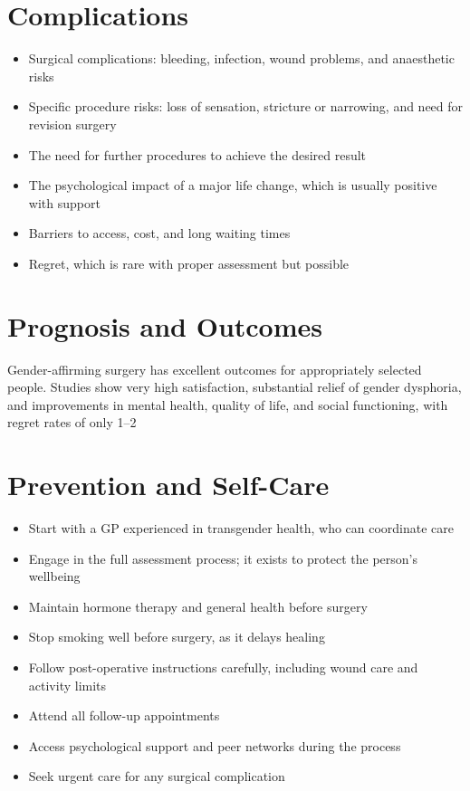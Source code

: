 \section*{Complications}
\begin{itemize}
    \item Surgical complications: bleeding, infection, wound problems, and anaesthetic risks
    \item Specific procedure risks: loss of sensation, stricture or narrowing, and need for revision surgery
    \item The need for further procedures to achieve the desired result
    \item The psychological impact of a major life change, which is usually positive with support
    \item Barriers to access, cost, and long waiting times
    \item Regret, which is rare with proper assessment but possible
\end{itemize}

\section*{Prognosis and Outcomes}
Gender-affirming surgery has excellent outcomes for appropriately selected people. Studies show very high satisfaction, substantial relief of gender dysphoria, and improvements in mental health, quality of life, and social functioning, with regret rates of only 1--2%

\section*{Prevention and Self-Care}
\begin{itemize}
    \item Start with a GP experienced in transgender health, who can coordinate care
    \item Engage in the full assessment process; it exists to protect the person's wellbeing
    \item Maintain hormone therapy and general health before surgery
    \item Stop smoking well before surgery, as it delays healing
    \item Follow post-operative instructions carefully, including wound care and activity limits
    \item Attend all follow-up appointments
    \item Access psychological support and peer networks during the process
    \item Seek urgent care for any surgical complication
\end{itemize}

